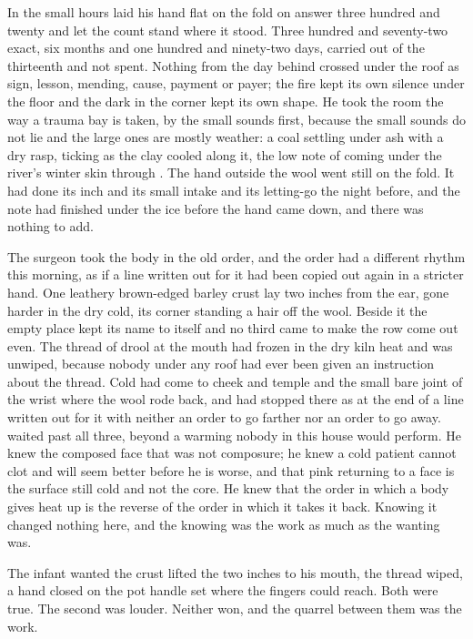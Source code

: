 
In the small hours  laid his hand flat on the fold on answer three hundred and twenty and let the count stand where it stood. Three hundred and seventy-two exact, six months and one hundred and ninety-two days, carried out of the thirteenth and not spent. Nothing from the day behind crossed under the roof as sign, lesson, mending, cause, payment or payer; the fire kept its own silence under the floor and the dark in the corner kept its own shape. He took the room the way a trauma bay is taken, by the small sounds first, because the small sounds do not lie and the large ones are mostly weather: a coal settling under ash with a dry rasp,  ticking as the clay cooled along it, the low note of  coming under the river's winter skin through . The hand outside the wool went still on the fold. It had done its inch and its small intake and its letting-go the night before, and the note had finished under the ice before the hand came down, and there was nothing to add.

The surgeon took the body in the old order, and the order had a different rhythm this morning, as if a line written out for it had been copied out again in a stricter hand. One leathery brown-edged barley crust lay two inches from the ear, gone harder in the dry cold, its corner standing a hair off the wool. Beside it the empty place kept its name to itself and no third came to make the row come out even. The thread of drool at the mouth had frozen in the dry kiln heat and was unwiped, because nobody under any roof had ever been given an instruction about the thread. Cold had come to cheek and temple and the small bare joint of the wrist where the wool rode back, and had stopped there as at the end of a line written out for it with neither an order to go farther nor an order to go away.  waited past all three, beyond a warming nobody in this house would perform. He knew the composed face that was not composure; he knew a cold patient cannot clot and will seem better before he is worse, and that pink returning to a face is the surface still cold and not the core. He knew that the order in which a body gives heat up is the reverse of the order in which it takes it back. Knowing it changed nothing here, and the knowing was the work as much as the wanting was.

The infant wanted the crust lifted the two inches to his mouth, the thread wiped, a hand closed on the pot handle set where the fingers could reach. Both were true. The second was louder. Neither won, and the quarrel between them was the work.


